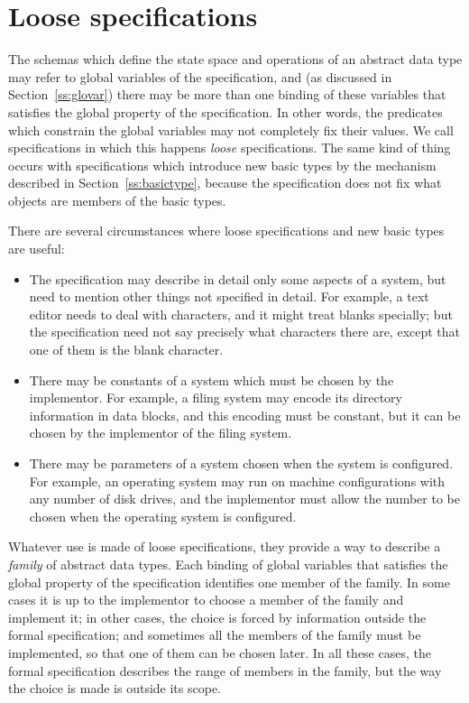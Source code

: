 \section{Loose specifications}\label{s:loose}

The schemas which define the state space
and operations of an abstract data type may refer to global variables
of the specification, and (as discussed in Section~\ref{ss:glovar})
there may be more than one binding of these variables that satisfies
the global property of the specification. In other words, the
predicates which constrain the global variables may not completely
fix their values.  We call specifications in which this happens {\em
loose} specifications.%
The same kind of thing occurs with specifications which introduce new
basic types by the mechanism described in Section~\ref{ss:basictype},
because the specification does not fix what objects are members of the
basic types.

There are several circumstances where loose specifications and new basic
types are useful:
\begin{itemize}
\item	The specification may describe in detail only some aspects of
	a system, but need to mention other things not specified in
	detail. For example, a text editor needs to deal with
	characters, and it might treat blanks specially; but the
	specification need not say precisely what characters there
	are, except that one of them is the blank character.

\item	There may be constants of a system which must be chosen by the
	implementor. For example, a filing system may encode its
	directory information in data blocks, and this encoding must
	be constant, but it can be chosen by the implementor of the
	filing system.

\item	There may be parameters of a system chosen when the system is
	configured. For example, an operating system may run on
	machine configurations with any number of disk drives, and the
	implementor must allow the number to be chosen when the
	operating system is configured.
\end{itemize}
Whatever use is made of loose specifications, they provide a way to
describe a {\em family} of abstract data types.  Each binding of
global variables that
satisfies the global property of the specification identifies one
member of the family.  In some cases it is up to the implementor to
choose a member of the family and implement it; in other cases, the
choice is forced by information outside the formal specification; and
sometimes all the members of the family must be implemented, so that
one of them can be chosen later. In all these cases, the formal
specification describes the range of members in the family, but the
way the choice is made is outside its scope.%


